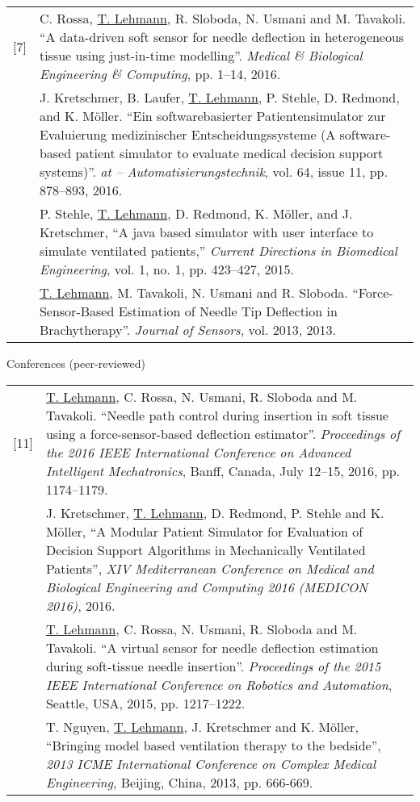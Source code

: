 \begin{cventries}
{\begin{longtable}{p{0.5cm} p{\textwidth - 0.5cm}}
        [7] & C. Rossa, \underline{T. Lehmann}, R. Sloboda, N. Usmani and M. Tavakoli. ``A data-driven soft sensor for needle deflection in heterogeneous tissue using just-in-time modelling''. \emph{Medical \& Biological Engineering \& Computing}, pp. 1--14, 2016. \\\relax
        [8] & J. Kretschmer, B. Laufer, \underline{T. Lehmann}, P. Stehle, D. Redmond, and K. M\"oller. ``Ein softwarebasierter Patientensimulator zur Evaluierung medizinischer Entscheidungssysteme (A software-based patient simulator to evaluate medical decision support systems)''. \emph{at -- Automatisierungstechnik}, vol. 64, issue 11, pp. 878--893, 2016. \\\relax
        [9] & P. Stehle, \underline{T. Lehmann}, D. Redmond, K. M\"{o}ller, and J. Kretschmer, ``A java based simulator with user interface to simulate ventilated patients,'' \emph{Current Directions in Biomedical Engineering}, vol. 1, no. 1, pp. 423--427, 2015. \\\relax
        [10] & \underline{T. Lehmann}, M. Tavakoli, N. Usmani and R. Sloboda. ``Force-Sensor-Based Estimation of Needle Tip Deflection in Brachytherapy''. \emph{Journal of Sensors}, vol. 2013, 2013.
    \end{longtable}
  }
  \cvpub
    {Conferences (peer-reviewed)}{
      \begin{longtable}{p{0.5cm} p{\textwidth - 0.5cm}}
        [11] & \underline{T. Lehmann}, C. Rossa, N. Usmani, R. Sloboda and M. Tavakoli. ``Needle path control during insertion in soft tissue using a force-sensor-based deflection estimator''. \emph{Proceedings of the 2016 IEEE International Conference on Advanced Intelligent Mechatronics}, Banff, Canada, July 12--15, 2016, pp. 1174--1179. \\\relax
        [12] & J. Kretschmer, \underline{T. Lehmann}, D. Redmond, P. Stehle and K. M\"oller, ``A Modular Patient Simulator for Evaluation of Decision Support Algorithms in Mechanically Ventilated Patients'', \emph{XIV Mediterranean Conference on Medical and Biological Engineering and Computing 2016 (MEDICON 2016)}, 2016. \\\relax
        [13] & \underline{T. Lehmann}, C. Rossa, N. Usmani, R. Sloboda and M. Tavakoli. ``A virtual sensor for needle deflection estimation during soft-tissue needle insertion''.  \emph{Proceedings of the 2015 IEEE International Conference on Robotics and Automation}, Seattle, USA, 2015, pp. 1217--1222. \\\relax
        [14] & T. Nguyen, \underline{T. Lehmann}, J. Kretschmer and K. M\"{o}ller, ``Bringing model based ventilation therapy to the bedside'', \emph{2013 ICME International Conference on Complex Medical Engineering}, Beijing, China, 2013, pp. 666-669.
      \end{longtable}
    }
\end{cventries}
